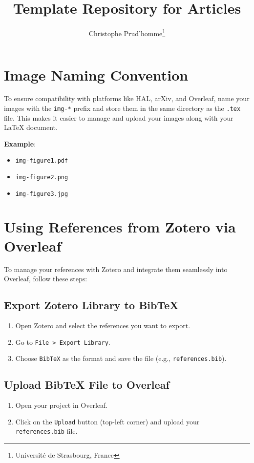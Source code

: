 \documentclass[a4paper]{article}
\begin{document}
\title{Template Repository for Articles}
\author{Christophe Prud'homme\thanks{Université de Strasbourg, France}}
\maketitle
\tableofcontents
\section{Image Naming Convention}

To ensure compatibility with platforms like HAL, arXiv, and Overleaf, name your images with the \texttt{img-*} prefix and store them in the same directory as the \texttt{.tex} file. This makes it easier to manage and upload your images along with your LaTeX document.

\textbf{Example}:
\begin{itemize}
    \item \texttt{img-figure1.pdf}
    \item \texttt{img-figure2.png}
    \item \texttt{img-figure3.jpg}
\end{itemize}

\section{Using References from Zotero via Overleaf}

To manage your references with Zotero and integrate them seamlessly into Overleaf, follow these steps:

\subsection{Export Zotero Library to BibTeX}
\begin{enumerate}
    \item Open Zotero and select the references you want to export.
    \item Go to \texttt{File > Export Library}.
    \item Choose \texttt{BibTeX} as the format and save the file (e.g., \texttt{references.bib}).
\end{enumerate}

\subsection{Upload BibTeX File to Overleaf}
\begin{enumerate}
    \item Open your project in Overleaf.
    \item Click on the \texttt{Upload} button (top-left corner) and upload your \texttt{references.bib} file.
\end{enumerate}
\end{document}
